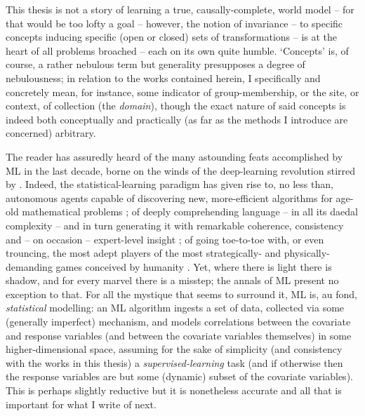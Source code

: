 %
This thesis is not a story of learning a true, causally-complete, world model -- for that would be
too lofty a goal -- however, the notion of invariance -- to specific concepts inducing specific
(open or closed) sets of transformations -- is at the heart of all problems broached -- each on
its own quite humble.
%
`Concepts' is, of course, a rather nebulous term but generality presupposes a degree of
nebulousness; in relation to the works contained herein, I specifically and concretely mean, for
instance, some indicator of group-membership, or the site, or context, of collection (the
\emph{domain}), though the exact nature of said concepts is indeed both conceptually and
practically (as far as the methods I introduce are concerned) arbitrary.
%

The reader has assuredly heard of the many astounding feats accomplished by ML in the last decade,
borne on the winds of the deep-learning revolution stirred by \cite{krizhevsky2012imagenet}.
%
Indeed, the statistical-learning paradigm has given rise to, no less than, autonomous agents
capable of discovering new, more-efficient algorithms for age-old mathematical problems
\citep{fawzi2022discovering}; of deeply comprehending language -- in all its daedal complexity --
and in turn generating it with remarkable coherence, consistency and -- on occasion -- expert-level
insight \citep{brown2020language}; of going toe-to-toe with, or even trouncing, the most adept
players of the most strategically- and physically-demanding games conceived by humanity
\citep{silver2017mastering,berner2019dota,vinyals2019grandmaster,meta2022human}.
%
Yet, where there is light there is shadow, and for every marvel there is a misstep; the annals of
ML present no exception to that.
%
For all the mystique that seems to surround it, ML is, au fond, \emph{statistical} modelling: an ML
algorithm ingests a set of data, collected via some (generally imperfect) mechanism, and models
correlations between the covariate and response variables (and between the covariate variables
themselves) in some higher-dimensional space, assuming for the sake of simplicity (and consistency
with the works in this thesis) a \emph{supervised-learning} task (and if otherwise then the response
variables are but some (dynamic) subset of the covariate variables).
%
This is perhaps slightly reductive but it is nonetheless accurate and all that is important for what
I write of next.

